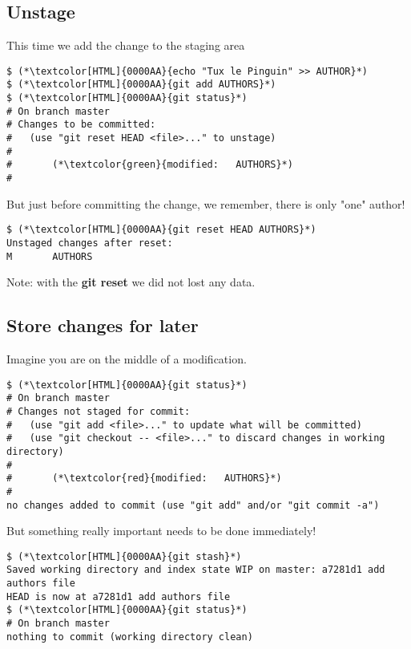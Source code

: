 \subsection{Unstage}
\begin{frame}[fragile]
\subslidetitle

This time we add the change to the staging area

\begin{lstlisting}
$ (*\textcolor[HTML]{0000AA}{echo "Tux le Pinguin" >> AUTHOR}*)
$ (*\textcolor[HTML]{0000AA}{git add AUTHORS}*)
$ (*\textcolor[HTML]{0000AA}{git status}*)
# On branch master
# Changes to be committed:
#   (use "git reset HEAD <file>..." to unstage)
#
#       (*\textcolor{green}{modified:   AUTHORS}*)
#
\end{lstlisting}

But just before committing the change, we remember, there is only "one" author!

\begin{lstlisting}
$ (*\textcolor[HTML]{0000AA}{git reset HEAD AUTHORS}*)
Unstaged changes after reset:
M       AUTHORS
\end{lstlisting}

Note: with the \textbf{git reset} we did not lost any data.

\end{frame}

\subsection{Store changes for later}
\begin{frame}[fragile]
\subslidetitle

Imagine you are on the middle of a modification.

\begin{lstlisting}
$ (*\textcolor[HTML]{0000AA}{git status}*)
# On branch master
# Changes not staged for commit:
#   (use "git add <file>..." to update what will be committed)
#   (use "git checkout -- <file>..." to discard changes in working directory)
#
#       (*\textcolor{red}{modified:   AUTHORS}*)
#
no changes added to commit (use "git add" and/or "git commit -a")
\end{lstlisting}

But something really important needs to be done immediately!

\begin{lstlisting}
$ (*\textcolor[HTML]{0000AA}{git stash}*)
Saved working directory and index state WIP on master: a7281d1 add authors file
HEAD is now at a7281d1 add authors file
$ (*\textcolor[HTML]{0000AA}{git status}*)
# On branch master
nothing to commit (working directory clean)
\end{lstlisting}
\end{frame}

